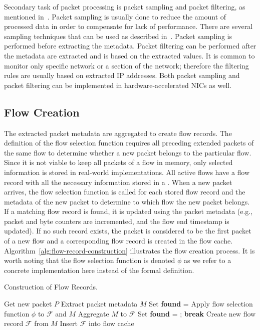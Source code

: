 Secondary task of packet processing is packet sampling and packet filtering, as mentioned in~\cite{rfc5470}. Packet sampling is usually done to reduce the amount of processed data in order to compensate for lack of performance. There are several sampling techniques that can be used as described in~\cite{rfc5476}. Packet sampling is performed before extracting the metadata. Packet filtering can be performed after the metadata are extracted and is based on the extracted values. It is common to monitor only specific network or a section of the network; therefore the filtering rules are usually based on extracted IP addresses. Both packet sampling and packet filtering can be implemented in hardware-accelerated NICs as well.

\subsection{Flow Creation}\label{subsec:flow-creation}

The extracted packet metadata are aggregated to create flow records. The definition of the flow selection function requires all preceding extended packets of the same flow to determine whether a new packet belongs to the particular flow. Since it is not viable to keep all packets of a flow in memory, only selected information is stored in real-world implementations. All active flows have a flow record with all the necessary information stored in a \emph{}. When a new packet arrives, the flow selection function is called for each stored flow record and the metadata of the new packet to determine to which flow the new packet belongs. If a matching flow record is found, it is updated using the packet metadata (e.g., packet and byte counters are incremented, and the flow end timestamp is updated). If no such record exists, the packet is considered to be the first packet of a new flow and a corresponding flow record is created in the flow cache. Algorithm~\ref{alg:flow-record-construction} illustrates the flow creation process. It is worth noting that the flow selection function is denoted $\phi$ as we refer to a concrete implementation here instead of the formal definition.

\begin{algorithm}
    \caption{Construction of Flow Records.}
    \label{alg:flow-record-construction}
    \begin{algorithmic}[1]
        \LOOP 
            \STATE Get new packet $P$
            \STATE Extract packet metadata $M$
            \STATE Set \textbf{found} = \FALSE
                \STATE Apply flow selection function $\phi$ to $\mathcal{F}$ and $M$
                    \STATE Aggregate $M$ to $\mathcal{F}$
                    \STATE Set \textbf{found} = \TRUE;
                    \STATE \textbf{break}
                \ENDIF
            \ENDFOR
                \STATE Create new flow record $\mathcal{F}$ from $M$
                \STATE Insert $\mathcal{F}$ into flow cache
            \ENDIF
        \ENDLOOP
    \end{algorithmic}
\end{algorithm}

